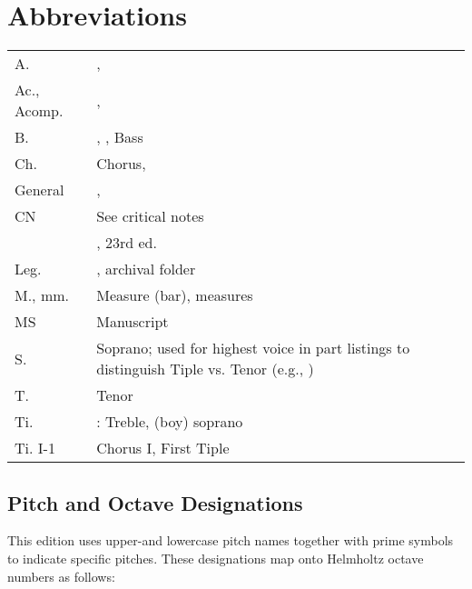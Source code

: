 
\section{Abbreviations}

\begin{tabulary}{\textwidth}{lL}
    A. 
    & ,  \\
   
    Ac., Acomp. 
    & ,  \\

    B.
    & , , Bass \\

    Ch. 
    & Chorus,  \\

    General 
    & ,  \\

    CN
    & See critical notes \\

    & , 23rd ed. \\

    Leg. 
    & , archival folder \\

    M., mm. 
    & Measure (bar), measures \\

    MS
    & Manuscript \\

    S.
    & Soprano; used for highest voice in part listings to distinguish Tiple
    vs. Tenor (e.g., ) \\

    T.
    & Tenor \\

    Ti.
    & : Treble, (boy) soprano \\

    Ti. I-1
    & Chorus I, First Tiple \\
\end{tabulary}
    
\subsection{Pitch and Octave Designations}

This edition uses upper-and lowercase pitch names together with prime symbols
to indicate specific pitches.
These designations map onto Helmholtz octave numbers as follows:
\begin{center}
\octavetable
\end{center}

